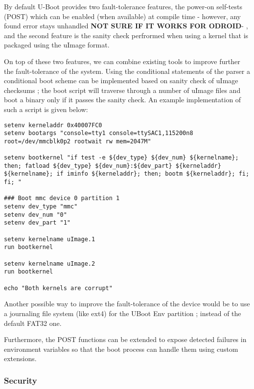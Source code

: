 By default U-Boot provides two fault-tolerance features, the power-on self-tests (POST) which can be enabled (when available) at compile time - however, any found error stays unhandled \textbf{NOT SURE IF IT WORKS FOR ODROID}- , and the second feature is the sanity check perfrormed when using a kernel that is packaged using the uImage format.

On top of these two features, we can combine existing tools to improve further the fault-tolerance of the system. Using the conditional statements of the parser a conditional boot scheme can be implemented based on sanity check of uImage checksums ; the boot script will traverse through a number of uImage files and boot a binary only if it passes the sanity check. An example implementation of such a script is given below:

\begin{lstlisting}
setenv kerneladdr 0x40007FC0
setenv bootargs "console=tty1 console=ttySAC1,115200n8 root=/dev/mmcblk0p2 rootwait rw mem=2047M"

setenv bootkernel "if test -e ${dev_type} ${dev_num} ${kernelname}; then; fatload ${dev_type} ${dev_num}:${dev_part} ${kerneladdr} ${kernelname}; if iminfo ${kerneladdr}; then; bootm ${kerneladdr}; fi; fi; "

### Boot mmc device 0 partition 1
setenv dev_type "mmc"
setenv dev_num "0"
setenv dev_part "1"

setenv kernelname uImage.1
run bootkernel

setenv kernelname uImage.2
run bootkernel

echo "Both kernels are corrupt"
\end{lstlisting}

Another possible way to improve the fault-tolerance of the device would be to use a journaling file system (like ext4) for the UBoot Env partition ; instead of the default FAT32 one.

Furthermore, the POST functions can be extended to expose detected failures in environment variables so that the boot process can handle them using custom extensions.

\subsubsection{Security}

